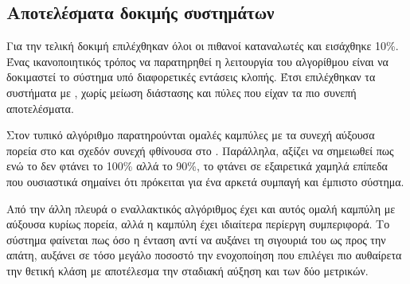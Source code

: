 \subsection{Αποτελέσματα δοκιμής συστημάτων}
Για την τελική δοκιμή επιλέχθηκαν όλοι οι πιθανοί καταναλωτές και εισάχθηκε 10\%. Ένας ικανοποιητικός τρόπος να παρατηρηθεί η λειτουργία του αλγορίθμου είναι να δοκιμαστεί το σύστημα υπό διαφορετικές εντάσεις κλοπής. Έτσι επιλέχθηκαν τα συστήματα με , χωρίς μείωση διάστασης και πύλες  που είχαν τα πιο συνεπή αποτελέσματα.\par
Στον τυπικό αλγόριθμο παρατηρούνται ομαλές καμπύλες με τα συνεχή αύξουσα πορεία στο  και σχεδόν συνεχή φθίνουσα στο . Παράλληλα, αξίζει να σημειωθεί πως ενώ το  δεν φτάνει το 100\% αλλά το 90\%, το  φτάνει σε εξαιρετικά χαμηλά επίπεδα που ουσιαστικά σημαίνει ότι πρόκειται για ένα αρκετά συμπαγή και έμπιστο σύστημα.\par
Από την άλλη πλευρά ο εναλλακτικός αλγόριθμος έχει και αυτός ομαλή καμπύλη  με αύξουσα κυρίως πορεία, αλλά η καμπύλη  έχει ιδιαίτερα περίεργη συμπεριφορά. Το σύστημα φαίνεται πως όσο η ένταση αντί να αυξάνει τη σιγουριά του ως προς την απάτη, αυξάνει σε τόσο μεγάλο ποσοστό την ενοχοποίηση που επιλέγει πιο αυθαίρετα την θετική κλάση με αποτέλεσμα την σταδιακή αύξηση και των δύο μετρικών.
